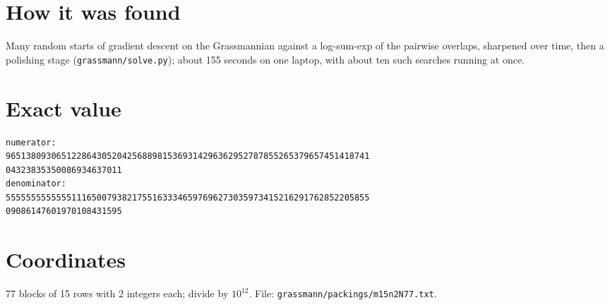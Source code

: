 \documentclass[11pt,a4paper]{article}
\begin{document}
\section{How it was found}
Many random starts of gradient descent on the Grassmannian against a log-sum-exp of the pairwise overlaps, sharpened over time, then a polishing stage (\texttt{grassmann/solve.py}); about 155 seconds on one laptop, with about ten such searches running at once.


\appendix
\section{Exact value}
{\small
\begin{verbatim}
numerator:
965138093065122864305204256889815369314296362952787855265379657451418741
04323835350086934637011
denominator:
555555555555511165007938217551633346597696273035973415216291762852205855
09086147601970108431595
\end{verbatim}}

\section{Coordinates}
77 blocks of 15 rows with 2 integers each; divide by $10^{12}$. File: \texttt{grassmann/packings/m15n2N77.txt}.
{\tiny
\begin{multicols}{4}
\end{multicols}}
\end{document}
